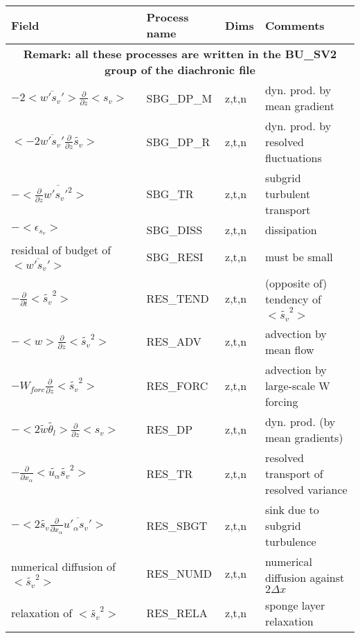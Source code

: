 \begin{longtable}[c]{|p{}|p{}|p{}|p{}|}
\hline
Field & Process name & Dims & Comments \\
\hline \hline
\endhead
\multicolumn{4}{|c|}{\textbf{Remark: all these processes are written in the BU\_SV2 group of the diachronic file}} \\
\hline
\endfoot
$- 2 <\overline{w's_v'}>\frac{\partial }{\partial z}<s_v>$         & SBG\_DP\_M & z,t,n & dyn. prod. by mean gradient \\\hline
$<-2 \overline{w's_v'}\frac{\partial}{\partial z}\tilde{s_v}>$     & SBG\_DP\_R & z,t,n & dyn. prod. by resolved fluctuations\\\hline
$-<\frac{\partial}{\partial z}\overline{w's_v'^2}>$                & SBG\_TR    & z,t,n & subgrid turbulent transport\\\hline
$-<\epsilon_{s_v}>$                                                & SBG\_DISS  & z,t,n & dissipation \\\hline
{\rm residual of budget of} $<\overline{w's_v'}>$                  & SBG\_RESI  & z,t,n & must be small \\\hline
$-\frac{\partial }{\partial t}<\tilde{s_v}^2>$                     & RES\_TEND  & z,t,n & (opposite of) tendency of $<\tilde{s_v}^2>$\\\hline
$-<w>\frac{\partial}{\partial z}<\tilde{s_v}^2>$                   & RES\_ADV   & z,t,n & advection by mean flow\\\hline
$-W_{forc}\frac{\partial}{\partial z}<\tilde{s_v}^2>$              & RES\_FORC  & z,t,n & advection by large-scale W forcing\\\hline
$-< 2 \tilde{w}\tilde{\theta_l}>\frac{\partial }{\partial z}<s_v>$ & RES\_DP    & z,t,n & dyn. prod. (by mean gradients) \\\hline
$-\frac{\partial}{\partial x_\alpha} <\tilde{u_\alpha} \tilde{s_v}^2>$ & RES\_TR   & z,t,n & resolved transport of resolved variance \\\hline
$- <2 \tilde{s_v}\frac{\partial}{\partial x_\alpha}\overline{u'_\alpha s_v'}>$ & RES\_SBGT & z,t,n & sink due to subgrid turbulence \\\hline
{\rm numerical diffusion of } $<\tilde{s_v}^2>$                    & RES\_NUMD  & z,t,n & numerical diffusion against $2\Delta x$ \\\hline
{\rm relaxation of }$<\tilde{s_v}^2>$                              & RES\_RELA  & z,t,n & sponge layer relaxation \\\hline

\end{longtable}
